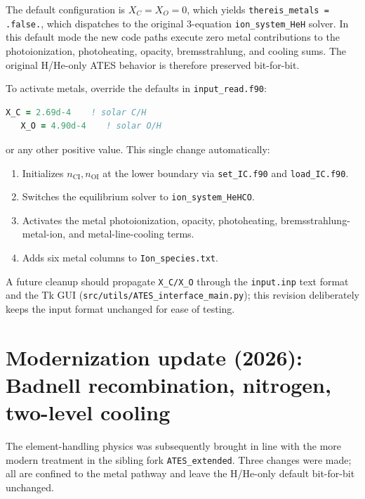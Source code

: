 \documentclass[english,a4paper]{kiseon_memo}
\begin{document}
The default configuration is \(X_C = X_O = 0\), which yields
\texttt{thereis\_metals = .false.}, which dispatches to the original
3-equation \texttt{ion\_system\_HeH} solver.  In this default mode the
new code paths execute zero metal contributions to the
photoionization, photoheating, opacity, bremsstrahlung, and cooling
sums.  The original H/He-only ATES behavior is therefore preserved
bit-for-bit.

To activate metals, override the defaults in \texttt{input\_read.f90}:
\begin{lstlisting}[language=Fortran]
   X_C = 2.69d-4    ! solar C/H
   X_O = 4.90d-4    ! solar O/H
\end{lstlisting}
or any other positive value.  This single change automatically:
\begin{enumerate}
  \item Initializes \(n_\mathrm{CI}, n_\mathrm{OI}\) at the lower
    boundary via \texttt{set\_IC.f90} and \texttt{load\_IC.f90}.
  \item Switches the equilibrium solver to
    \texttt{ion\_system\_HeHCO}.
  \item Activates the metal photoionization, opacity, photoheating,
    bremsstrahlung-metal-ion, and metal-line-cooling terms.
  \item Adds six metal columns to \texttt{Ion\_species.txt}.
\end{enumerate}
\begin{sloppypar}
A future cleanup should propagate \texttt{X\_C/X\_O} through the
\texttt{input.inp} text format and the Tk GUI
(\texttt{src/utils/ATES\_interface\_main.py}); this revision
deliberately keeps the input format unchanged for ease of testing.
\end{sloppypar}

\section{Modernization update (2026): Badnell recombination, nitrogen,
two-level cooling}
\label{sec:modernization}

The element-handling physics was subsequently brought in line with the
more modern treatment in the sibling fork \texttt{ATES\_extended}.  Three
changes were made; all are confined to the metal pathway and leave the
H/He-only default bit-for-bit unchanged.
\end{document}
